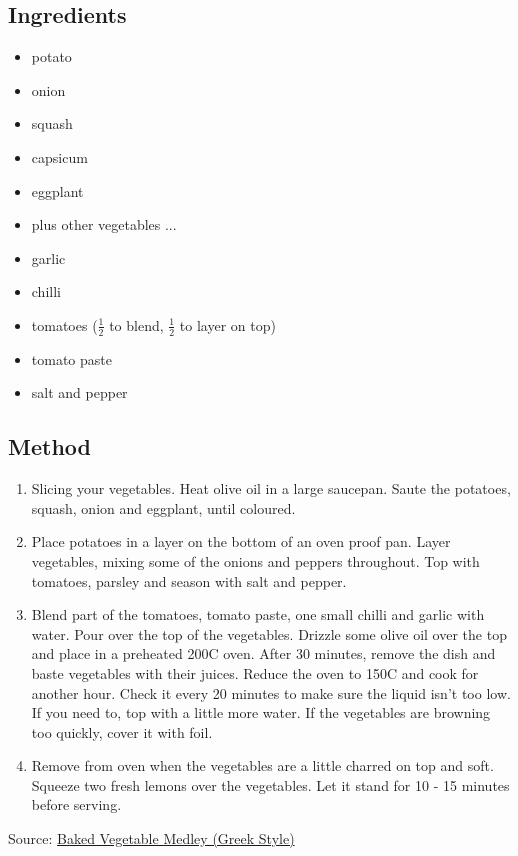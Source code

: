 \documentclass[11pt,a4paper]{article}
\begin{document}
\subsection*{Ingredients}

\begin{multicols}{2}

\begin{itemize}
   \item potato
   \item onion
   \item squash
   \item capsicum
   \item eggplant
   \item plus other vegetables ...
\end{itemize}

\columnbreak

\begin{itemize}
   \item garlic
   \item chilli
   \item tomatoes ($\frac{1}{2}$ to blend, $\frac{1}{2}$ to layer on top)
   \item tomato paste
   \item salt and pepper
\end{itemize}

\end{multicols}

\medskip

\subsection*{Method}

\begin{enumerate}
   \item Slicing your vegetables.  Heat olive oil in a large saucepan. Saute the potatoes, squash, onion and eggplant, until coloured.
   \item Place potatoes in a layer on the bottom of an oven proof pan.  Layer vegetables, mixing some of the onions and peppers throughout.  Top with tomatoes, parsley and season with salt and pepper.
   \item Blend part of the tomatoes, tomato paste, one small chilli and garlic with water. Pour over the top of the vegetables.  Drizzle some olive oil over the top and place in a preheated 200\textdegree C oven. After 30 minutes, remove the dish and baste vegetables with their juices.  Reduce the oven to 150\textdegree C and cook for another hour.  Check it every 20 minutes to make sure the liquid isn't too low.  If you need to, top with a little more water.  If the vegetables are browning too quickly, cover it with foil.
   \item Remove from oven when the vegetables are a little charred on top and soft.  Squeeze two fresh lemons over the vegetables. Let it stand for 10 - 15 minutes before serving.
\end{enumerate}

Source: \href{https://www.artfrommytable.com/baked-vegetable-medley-greek-style/}{Baked Vegetable Medley (Greek Style)}
\end{document}
